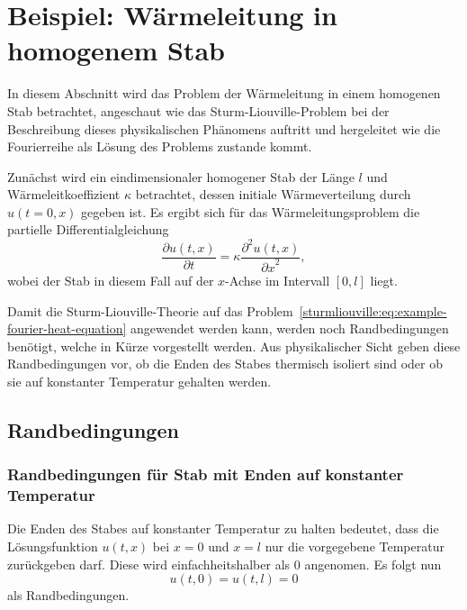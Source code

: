 %
%
%

\section{Beispiel: Wärmeleitung in homogenem Stab}

In diesem Abschnitt wird das Problem der Wärmeleitung in einem homogenen Stab
betrachtet, angeschaut wie das Sturm-Liouville-Problem bei der Beschreibung
dieses physikalischen Phänomens auftritt und hergeleitet wie die Fourierreihe
als Lösung des Problems zustande kommt.

Zunächst wird ein eindimensionaler homogener Stab der Länge $l$ und
Wärmeleitkoeffizient $\kappa$ betrachtet, dessen initiale Wärmeverteilung durch
$u(t=0, x)$ gegeben ist.
Es ergibt sich für das Wärmeleitungsproblem die partielle Differentialgleichung
\begin{equation}
    \label{sturmliouville:eq:example-fourier-heat-equation}
    \frac{\partial u(t, x)}{\partial t} =
    \kappa \frac{\partial^{2}u(t, x)}{{\partial x}^{2}},
\end{equation}
wobei der Stab in diesem Fall auf der $x$-Achse im Intervall $[0,l]$ liegt.

Damit die Sturm-Liouville-Theorie auf das
Problem~\eqref{sturmliouville:eq:example-fourier-heat-equation} angewendet
werden kann, werden noch Randbedingungen benötigt, welche in Kürze
vorgestellt werden.
Aus physikalischer Sicht geben diese Randbedingungen vor, ob die Enden des
Stabes thermisch isoliert sind oder ob sie auf konstanter Temperatur gehalten
werden.

%
%
\subsection{Randbedingungen}
\subsubsection{Randbedingungen für Stab mit Enden auf konstanter Temperatur}

Die Enden des Stabes auf konstanter Temperatur zu halten bedeutet, dass die
Lösungsfunktion $u(t,x)$ bei $x = 0$ und $x = l$ nur die vorgegebene
Temperatur zurückgeben darf. Diese wird einfachheitshalber als $0$ angenomen.
Es folgt nun
\begin{equation}
    \label{sturmliouville:eq:example-fourier-boundary-condition-ends-constant}
    u(t,0)
    =
    u(t,l)
    =
    0
\end{equation}
als Randbedingungen.

